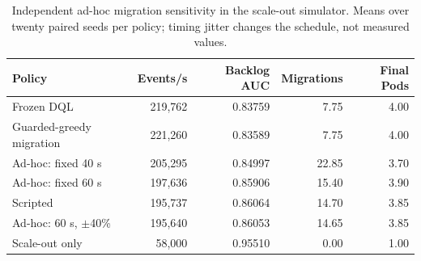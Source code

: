 \begin{table}[!htbp]
\centering\small
\caption{Independent ad-hoc migration sensitivity in the scale-out simulator. Means over twenty paired seeds per policy; timing jitter changes the schedule, not measured values.}
\label{tab:adhoc-migration}
\begin{tabular}{lrrrr}
\toprule
Policy & Events/s & Backlog AUC & Migrations & Final Pods \\
\midrule
Frozen DQL & 219,762 & 0.83759 & 7.75 & 4.00 \\
Guarded-greedy migration & 221,260 & 0.83589 & 7.75 & 4.00 \\
Ad-hoc: fixed 40 s & 205,295 & 0.84997 & 22.85 & 3.70 \\
Ad-hoc: fixed 60 s & 197,636 & 0.85906 & 15.40 & 3.90 \\
Scripted & 195,737 & 0.86064 & 14.70 & 3.85 \\
Ad-hoc: 60 s, $\pm$40\% & 195,640 & 0.86053 & 14.65 & 3.85 \\
Scale-out only & 58,000 & 0.95510 & 0.00 & 1.00 \\
\bottomrule
\end{tabular}
\end{table}
